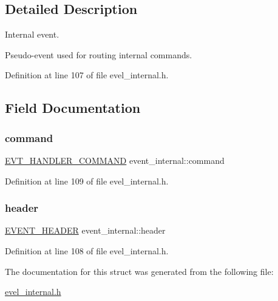 \subsection{Detailed Description}
Internal event. 

Pseudo-\/event used for routing internal commands. 

Definition at line 107 of file evel\+\_\+internal.\+h.



\subsection{Field Documentation}
\hypertarget{structevent__internal_a7aabad85d349fa4a2d8cefe380fca9de}{}\label{structevent__internal_a7aabad85d349fa4a2d8cefe380fca9de} 
\subsubsection{\texorpdfstring{command}{command}}
{\footnotesize\ttfamily \hyperlink{evel__internal_8h_a54a85a3e4ac8075dd263aa69a7b32ba9}{E\+V\+T\+\_\+\+H\+A\+N\+D\+L\+E\+R\+\_\+\+C\+O\+M\+M\+A\+ND} event\+\_\+internal\+::command}



Definition at line 109 of file evel\+\_\+internal.\+h.

\hypertarget{structevent__internal_a9bc97bfd3fc7deffd3df855e7e814645}{}\label{structevent__internal_a9bc97bfd3fc7deffd3df855e7e814645} 
\subsubsection{\texorpdfstring{header}{header}}
{\footnotesize\ttfamily \hyperlink{evel_8h_aa0ea94c675729365ea7825c4fc7e06d8}{E\+V\+E\+N\+T\+\_\+\+H\+E\+A\+D\+ER} event\+\_\+internal\+::header}



Definition at line 108 of file evel\+\_\+internal.\+h.



The documentation for this struct was generated from the following file\+:\begin{DoxyCompactItemize}
\item 
\hyperlink{evel__internal_8h}{evel\+\_\+internal.\+h}\end{DoxyCompactItemize}
